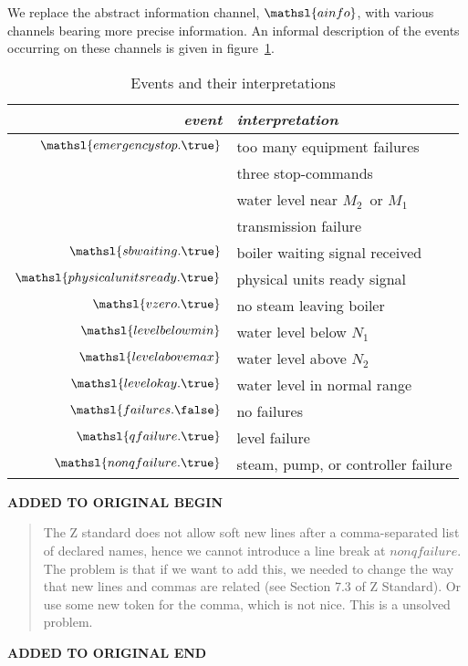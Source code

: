 \documentclass{report}
\newcommand{\event}[1]{\mathsl{#1}}
\newenvironment{addedstuff}{\begin{flushleft}\textbf{ADDED TO ORIGINAL BEGIN}\begin{quote}\begin{minipage}{.8\textwidth}}{\end{minipage}\end{quote}\textbf{ADDED TO ORIGINAL END}\end{flushleft}}
\begin{document}
We replace the abstract information channel, \( \mathsl{ainfo} \),
with various channels bearing more precise information.  An informal
description of the events occurring on these channels is given in
figure~\ref{figure:events}.
\begin{table}[htbp]
  \bigskip %
  \begin{center}
    \begin{tabular}{r|l}
      \textbf{\slshape event} & \textbf{\slshape interpretation}
      \\ %
      \hline %
      \( \event{emergencystop.\true} \) & too many equipment failures
      \\ %
      & three stop-commands
      \\ %
      & water level near \( M_2 \, \)\/ or \( M_1 \)
      \\ %
      & transmission failure
      \\ %
      \( \event{sbwaiting.\true} \) & boiler waiting signal received
      \\ %
      \( \event{physicalunitsready.\true} \) & physical units ready signal
      \\ %
      \( \event{vzero.\true} \) & no steam leaving boiler
      \\ %
      \( \event{levelbelowmin} \) & water level below \( N_1 \)
      \\ %
      \( \event{levelabovemax} \) & water level above \( N_2 \)
      \\ %
      \( \event{levelokay.\true} \) & water level in normal range
      \\ %
      \( \event{failures.\false} \) & no failures
      \\ %
      \( \event{qfailure.\true} \) & level failure
      \\ %
      \( \event{nonqfailure.\true} \) & steam, pump, or controller failure
    \end{tabular}
  \end{center}
  \caption{Events and their interpretations}\label{figure:events}
\end{table}
%
\begin{addedstuff}
   The Z standard does not allow soft new lines after a comma-separated list
   of declared names, hence we cannot introduce a line break at $nonqfailure$.
   The problem is that if we want to add this, we needed to change the way that
   new lines and commas are related (see Section 7.3 of Z Standard). Or use some
   new token for the comma, which is not nice. This is a unsolved problem.
\end{addedstuff}
\end{document}
